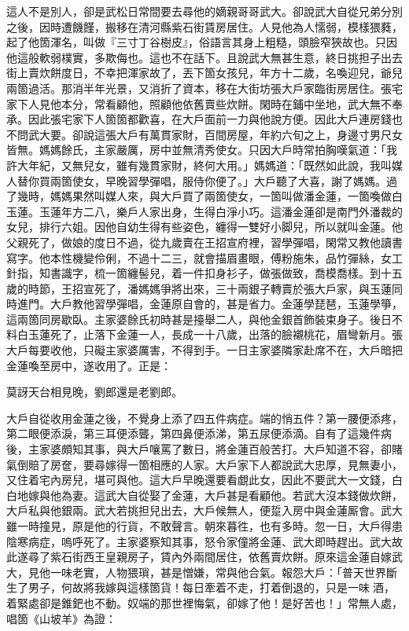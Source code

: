 這人不是別人，卻是武松日常間要去尋他的嫡親哥哥武大。卻說武大自從兄弟分別之後，因時遭饑饉，搬移在清河縣紫石街賃房居住。人見他為人懦弱，模樣猥蕤，起了他箇渾名，叫做『三寸丁谷樹皮』，俗語言其身上粗糙，頭臉窄狹故也。只因他這般軟弱樸實，多欺侮也。這也不在話下。且說武大無甚生意，終日挑担子出去街上賣炊餅度日，不幸把渾家故了，丟下箇女孩兒，年方十二歲，名喚迎兒，爺兒兩箇過活。那消半年光景，又消折了資本，移在大街坊張大戶家臨街房居住。張宅家下人見他本分，常看顧他，照顧他依舊賣些炊餅。閑時在鋪中坐地，武大無不奉承。因此張宅家下人箇箇都歡喜，在大戶面前一力與他說方便。因此大戶連房錢也不問武大要。卻說這張大戶有萬貫家財，百間房屋，年約六旬之上，身邊寸男尺女皆無。媽媽餘氏，主家嚴厲，房中並無清秀使女。只因大戶時常拍胸嘆氣道：「我許大年紀，又無兒女，雖有幾貫家財，終何大用。」媽媽道：「既然如此說，我叫媒人替你買兩箇使女，早晚習學彈唱，服侍你便了。」大戶聽了大喜，謝了媽媽。過了幾時，媽媽果然叫媒人來，與大戶買了兩箇使女，一箇叫做潘金蓮，一箇喚做白玉蓮。玉蓮年方二八，樂戶人家出身，生得白淨小巧。這潘金蓮卻是南門外潘裁的女兒，排行六姐。因他自幼生得有些姿色，纏得一雙好小脚兒，{}所以就叫金蓮。他父親死了，做娘的度日不過，從九歲賣在王招宣府裡，{}習學彈唱，閑常又教他讀書寫字。他本性機變伶俐，不過十二三，就會描眉畫眼，傅粉施朱，品竹彈絲，女工針指，知書識字，梳一箇纏髻兒，着一件扣身衫子，做張做致，喬模喬樣。{}到十五歲的時節，王招宣死了，潘媽媽爭將出來，三十兩銀子轉賣於張大戶家，與玉蓮同時進門。大戶教他習學彈唱，金蓮原自會的，甚是省力。金蓮學琵琶，玉蓮學箏，這兩箇同房歇臥。主家婆餘氏初時甚是擡舉二人，與他金銀首飾裝束身子。後日不料白玉蓮死了，止落下金蓮一人，長成一十八歲，出落的臉襯桃花，眉彎新月。張大戶每要收他，只礙主家婆厲害，不得到手。{}一日主家婆隣家赴席不在，大戶暗把金蓮喚至房中，遂收用了。正是：

\begin{myquote}
莫訝天台相見晚，劉郎還是老劉郎。{}
\end{myquote}

大戶自從收用金蓮之後，不覺身上添了四五件病症。{}端的悄五件？第一腰便添疼，第二眼便添淚，第三耳便添聾，第四鼻便添涕，第五尿便添滴。自有了這幾件病後，主家婆頗知其事，與大戶嚷罵了數日，將金蓮百般苦打。大戶知道不容，卻賭氣倒賠了房奩，要尋嫁得一箇相應的人家。大戶家下人都說武大忠厚，見無妻小，又住着宅內房兒，堪可與他。這大戶早晚還要看覷此女，{}因此不要武大一文錢，白白地嫁與他為妻。這武大自從娶了金蓮，大戶甚是看顧他。若武大沒本錢做炊餅，大戶私與他銀兩。武大若挑担兒出去，大戶候無人，便踅入房中與金蓮厮會。武大雖一時撞見，原是他的行貨，不敢聲言。朝來暮徃，也有多時。忽一日，大戶得患陰寒病症，嗚呼死了。主家婆察知其事，怒令家僮將金蓮、武大即時趕出。武大故此遂尋了紫石街西王皇親房子，賃內外兩間居住，依舊賣炊餅。原來這金蓮自嫁武大，見他一味老實，人物猥瑣，甚是憎嫌，{}常與他合氣。報怨大戶：「普天世界斷生了男子，何故將我嫁與這樣箇貨！每日牽着不走，打着倒退的，只是一味𠳹酒，着緊處卻是錐鈀也不動。奴端的那世裡悔氣，卻嫁了他！是好苦也！」常無人處，唱箇《山坡羊》為證：

